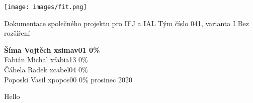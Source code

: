 \documentclass[a4paper,11pt,twocolumn]{article}
\begin{document}
\begin{titlepage}
\begin{center}
\Huge
\texttt{[image: images/fit.png]}

\vfill
\huge
Dokumentace společného projektu pro IFJ a IAL
\vfill
\huge
Tým číslo 041, varianta I
\vfill
\huge
Bez rozšíření
\vfill
\end{center}
{\LARGE {\textbf{Šíma Vojtěch 	xsimav01 0\%}\\
Fabián Michal   xfabia13 0\%\\
Čábela Radek    xcabel04 0\%\\
Poposki Vasil   xpopos00 0\%}
\hfill
prosinec 2020}
\end{titlepage}
\newpage
Hello
\end{document}
